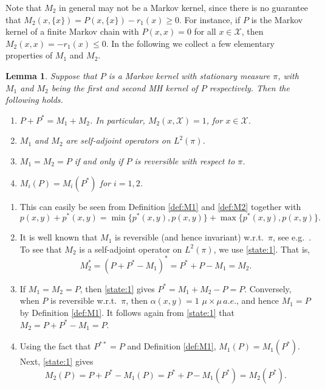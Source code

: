 \documentclass[12pt,a4]{amsart}
\numberwithin{equation}{section}
\theoremstyle{plain}
\newtheorem{lemma}{Lemma}[section]
\theoremstyle{definition}
\theoremstyle{remark}
\let\oldendproof\endproof
\renewenvironment{proof}[1][\proofname]{%
  \oldproof[\noindent\textbf{#1.} ]%
}{\oldendproof}
\newcommand{\1}{\mathds{1}}
\renewcommand{\leq}{\leqslant}
\renewcommand{\geq}{\geqslant}
\begin{document}
Note that $M_2$ in general may not be a Markov kernel, since there is no guarantee that $M_2(x,\{x\}) = P(x,\{x\}) - r_1(x) \geq 0$. For instance, if $P$ is the Markov kernel of a finite Markov chain with $P(x,x) = 0$ for all $x \in \mathcal{X}$, then $M_2(x,x) = -r_1(x) \leq 0$. In the following we collect a few elementary properties of $M_1$ and $M_2$.

\begin{lemma}\label{lem:M1M2prop}
	Suppose that $P$ is a Markov kernel with stationary measure $\pi$, with $M_1$ and $M_2$ being the first and second MH kernel of $P$ respectively. Then the following holds.
	\begin{enumerate}[label={\upshape(\roman*)}, align=left, widest=iii, leftmargin=*]
		\item $P + P^* = M_1 + M_2$. In particular, $M_2(x, \mathcal{X}) = 1$, for $x \in \mathcal{X}$. \label{state:1}
		\item $M_1$ and $M_2$ are self-adjoint operators on $L^2(\pi)$. \label{state:2}
		\item $M_1 = M_2 = P$ if and only if $P$ is reversible with respect to $\pi$. \label{state:3}
		\item $M_i(P) = M_i(P^*)$ for $i = 1,2$. \label{state:4}
	\end{enumerate}
\end{lemma}

\begin{proof}
	\begin{enumerate}[label={\upshape(\roman*)}, align=left, widest=iii, leftmargin=*]
		\item This can easily be seen from Definition \ref{def:M1} and \ref{def:M2} together with $$p(x,y) + p^*(x,y) = \min\{p^*(x,y),p(x,y)\} + \max\{p^*(x,y),p(x,y)\}.$$
		
		\item It is well known that $M_1$ is reversible (and hence invariant) w.r.t.~$\pi$, see e.g.~\cite[Proposition $2$]{RR04}. To see that $M_2$ is a self-adjoint operator on $L^2(\pi)$, we use \ref{state:1}. That is,
		$$M_2^* = (P + P^* - M_1)^* = P^* + P - M_1 = M_2.$$
		
		\item If $M_1 = M_2 = P$, then \ref{state:1} gives $P^* = M_1 + M_2 - P = P$. Conversely, when $P$ is reversible w.r.t.~$\pi$, then $\alpha(x,y) = 1$ $\mu \times \mu \, a.e.$, and hence $M_1 = P$ by Definition \ref{def:M1}. It follows again from \ref{state:1} that $M_2 = P + P^* - M_1 = P$.
		
		\item Using the fact that $P^{**} = P$ and Definition \ref{def:M1}, $M_1(P) = M_1(P^*).$ Next, \ref{state:1} gives
		$$M_2(P) = P + P^* - M_1(P) = P^* + P - M_1(P^*) = M_2(P^*).$$
	\end{enumerate}
\end{proof}
\end{document}
